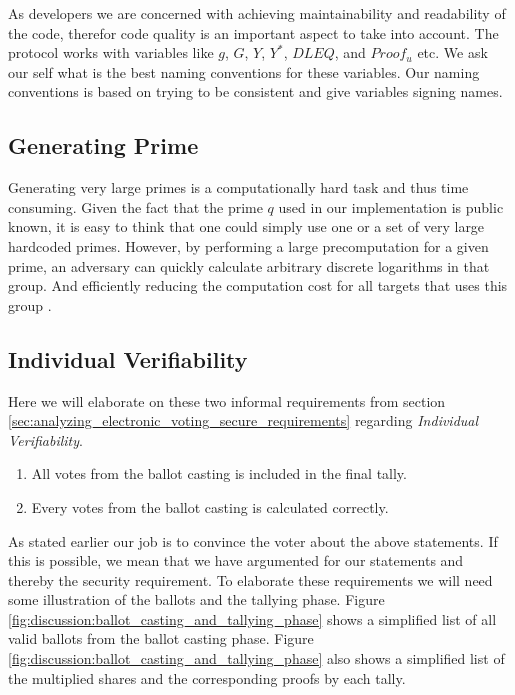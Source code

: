 \noindent
As developers we are concerned with achieving maintainability and readability of the code, therefor code quality is an important aspect to take into account. The protocol works with variables like $g$, $G$, $Y$, $Y^*$, $DLEQ$, and $Proof_u$ etc. We ask our self what is the best naming conventions for these variables. Our naming conventions is based on trying to be consistent and give variables signing names.  


\subsection{Generating Prime}
Generating very large primes is a computationally hard task and thus time consuming. Given the fact
that the prime $q$ used in our implementation is public known, it is easy to think that one could simply
use one or a set of very large hardcoded primes. However, by performing a large precomputation for a given
prime, an adversary can quickly calculate arbitrary discrete logarithms in that group. And efficiently reducing the computation cost for all targets that uses this group \cite{Adrian:2015:IFS:2810103.2813707}. 


\subsection{Individual Verifiability} \label{sec:discussion_individual_verifiability}
Here we will elaborate on these two informal requirements from section \ref{sec:analyzing_electronic_voting_secure_requirements} regarding \textit{Individual Verifiability}. 

\begin{enumerate}
    \item All votes from the ballot casting is included in the final tally.
    \item Every votes from the ballot casting is calculated correctly.
\end{enumerate}

\noindent
As stated earlier our job is to convince the voter about the above statements. If this is possible, we mean that we have argumented for our statements and thereby the security requirement. To elaborate these requirements we will need some illustration of the ballots and the tallying phase. Figure \ref{fig:discussion:ballot_casting_and_tallying_phase} shows a simplified list of all valid ballots from the ballot casting phase. Figure \ref{fig:discussion:ballot_casting_and_tallying_phase} also shows a simplified list of the multiplied shares and the corresponding proofs by each tally.\\

